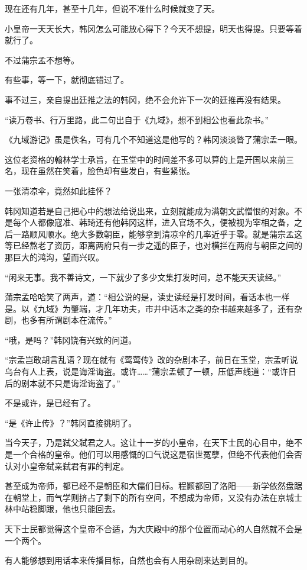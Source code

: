 现在还有几年，甚至十几年，但说不准什么时候就变了天。

小皇帝一天天长大，韩冈怎么可能放心得下？今天不想提，明天也得提。只要等着就行了。

不过蒲宗孟不想等。

有些事，等一下，就彻底错过了。

事不过三，亲自提出廷推之法的韩冈，绝不会允许下一次的廷推再没有结果。

“读万卷书、行万里路，此二句出自于《九域》，想不到相公也看此杂书。”

《九域游记》虽是佚名，可有几个不知道这是他写的？韩冈淡淡瞥了蒲宗孟一眼。

这位老资格的翰林学士承旨，在玉堂中的时间差不多可以算的上是开国以来前三名，现在虽然在笑着，脸色却有些发白，有些紧张。

一张清凉伞，竟然如此挂怀？

韩冈知道若是自己把心中的想法给说出来，立刻就能成为满朝文武憎恨的对象。不是每个人都像寇准、韩琦还有他韩冈这样，进入官场不久，便被视为宰相之备，之后一路顺风顺水。绝大多数朝臣，能够拿到清凉伞的几率近乎于零。就是蒲宗孟这等已经熬老了资历，距离两府只有一步之遥的臣子，也对横拦在两府与朝臣之间的那巨大的鸿沟，望而兴叹。

“闲来无事。我不善诗文，一下就少了多少文集打发时间，总不能天天读经。”

蒲宗孟哈哈笑了两声，道：“相公说的是，读史读经是打发时间，看话本也一样是。以《九域》为肇端，才几年功夫，市井中话本之类的杂书越来越多了，还有杂剧，也多有所谓剧本在流传。”

“哦，是吗？”韩冈饶有兴致的问道。

“宗孟岂敢胡言乱语？现在就有《莺莺传》改的杂剧本子，前日在玉堂，宗孟听说乌台有人上表，说是诲淫诲盗。或许……”蒲宗孟顿了一顿，压低声线道：“或许日后的剧本就不只是诲淫诲盗了。”

不是或许，是已经有了。

“是《许止传》？”韩冈直接挑明了。

当今天子，乃是弑父弑君之人。这让十一岁的小皇帝，在天下士民的心目中，绝不是一个合格的皇帝。他们可以用感慨的口气说这是宿世冤孽，但绝不代表他们会否认对小皇帝弑亲弑君有罪的判定。

甚至成为帝师，都已经不是朝臣和大儒们目标。程颢都回了洛阳——新学依然盘踞在朝堂上，而气学则挤占了剩下的所有空间，不想成为帝师，又没有办法在京城士林中站稳脚跟，他也只能回去。

天下士民都觉得这个皇帝不合适，为大庆殿中的那个位置而动心的人自然就不会是一个两个。

有人能够想到用话本来传播目标，自然也会有人用杂剧来达到目的。


